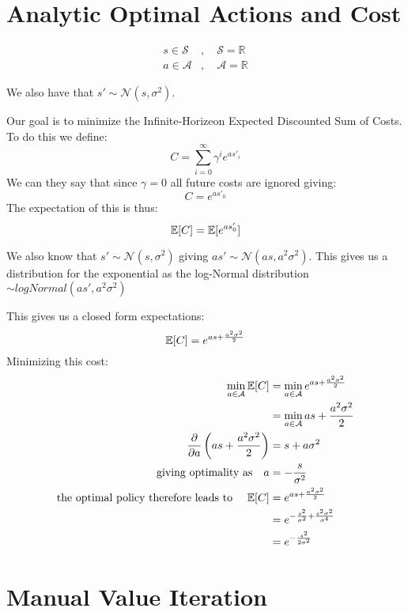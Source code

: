 \documentclass[11pt]{article}
\begin{document}
\maketitle
\thispagestyle{first}

\section{Analytic Optimal Actions and Cost}
\begin{align}
    s\in{\mathcal{S}}&,\quad \mathcal{S} = \mathbb{R}\\
    a\in{\mathcal{A}}&,\quad \mathcal{A} = \mathbb{R}
\end{align}

We also have that $s' \sim \mathcal{N}(s, \sigma^2)$. 

Our goal is to minimize the Infinite-Horizeon Expected Discounted Sum of Costs. To do this we define:
$$
C = \sum_{i=0}^\infty \gamma^ie^{as'_i}
$$
We can they say that since $\gamma = 0$ all future costs are ignored giving:
$$
C = e^{as'_0}
$$
The expectation of this is thus:
$$
\mathbb{E}[C] = \mathbb{E}[e^{as'_0}]
$$

We also know that $s'\sim\mathcal{N}(s, \sigma^2)$ giving $as'\sim\mathcal{N}(as, a^2\sigma^2)$. This gives us a distribution for the exponential as the log-Normal distribution $\sim logNormal(as', a^2\sigma^2)$

This gives us a closed form expectations:
$$
\mathbb{E}[C] = e^{as + \frac{a^2\sigma^2}{2}}
$$
Minimizing this cost:
\begin{align}
    \min_{a\in\mathcal{A}} \mathbb{E}[C] &= \min_{a\in\mathcal{A}} e^{as + \frac{a^2\sigma^2}{2}}\\
    &= \min_{a\in\mathcal{A}} as + \frac{a^2\sigma^2}{2} \\
    \frac{\partial}{\partial a}\left(as + \frac{a^2\sigma^2}{2}\right) &= s + a\sigma^2 \\
    \text{giving optimality as}\quad a &= -\frac{s}{\sigma^2}\\
    \text{the optimal policy therefore leads to }\quad \mathbb{E}[C] &= e^{as + \frac{a^2\sigma^2}{2}} \\
    &= e^{-\frac{s^2}{\sigma^2} + \frac{s^2\sigma^2}{\sigma^4}} \\
    &= e^{-\frac{s^2}{2\sigma^2}}
\end{align}

\newpage
\section{Manual Value Iteration}
\end{document}

